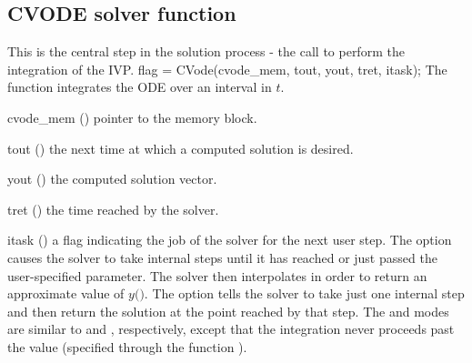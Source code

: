 \subsection{CVODE solver function}\label{sss:cvode}

This is the central step in the solution process - the call to
perform the integration of the IVP.
%
{
  flag = CVode(cvode\_mem, tout, yout, tret, itask);
}
{
  The function  integrates the ODE over an interval in $t$.
}
{
  \begin{args}
  \item[cvode\_mem] ()
    pointer to the {\cvodes} memory block.
  \item[tout] ()
    the next time at which a computed solution is desired.
  \item[yout] ()
    the computed solution vector.
  \item[tret] ()
    the time reached by the solver.
  \item[itask] ()
    a flag indicating the job of the solver for the next user step. 
    The  option causes the solver to take internal steps until   
    it has reached or just passed the user-specified 
    parameter. The solver then interpolates in order to   
    return an approximate value of $y($$)$. 
    The  option tells the solver to take just one internal step  
    and then return the solution at the point reached by that step. 
    The  and  modes are     
    similar to  and , respectively, except    
    that the integration never proceeds past the value      
     (specified through the function ).
  \end{args}
}
